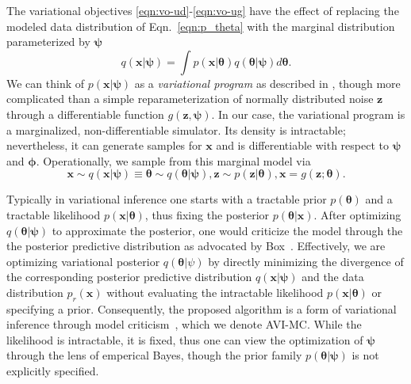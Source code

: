 \documentclass[twocolumn,superscriptaddress,aps]{revtex4-1}
\newcommand{\qxpsi}{q(\mathbf{x}|\bfpsi)}
\newcommand{\bftheta}{{\bm \theta}}
\newcommand{\bfpsi}{{\bm \psi}}
\newcommand{\bfphi}{{\bm \phi}}
\newcommand{\bfx}{\mathbf{x}}
\newcommand{\bfz}{\mathbf{z}}
\theoremstyle{plain}
\begin{document}
The variational objectives \ref{eqn:vo-ud}-\ref{eqn:vo-ug}
have the effect of replacing the modeled data distribution of Eqn.~\ref{eqn:p_theta} with
the marginal distribution parameterized by $\bfpsi$
\begin{equation}
    \qxpsi = \int  p(\mathbf{x}|\bftheta) q(\bftheta|\bfpsi) d\bftheta.
\end{equation}
We can think of $p(\bfx|\bfpsi)$ as a \textit{variational program} as described in \citep{2016arXiv161009033R}, though more complicated than a simple reparameterization of normally distributed noise $\bfz$ through a differentiable function $g(\bfz, \bfpsi)$. In our case, the variational program is a marginalized, non-differentiable  simulator.  Its density is  intractable; nevertheless, it can generate samples for $\bfx$ and is differentiable with respect to $\bfpsi$ and $\bfphi$. 
Operationally, we sample from this marginal model via
\begin{equation}\label{eqn:p_psi}
    \mathbf{x} \sim \qxpsi \equiv \bftheta \sim q(\bftheta|\bfpsi), \bfz \sim p(\bfz|\bftheta), \mathbf{x} = g(\bfz; \bftheta).
\end{equation}

Typically in variational inference one starts with a tractable prior $p(\bftheta)$ and a tractable likelihood $p(\bfx |\bftheta )$, thus fixing the posterior $p(\bftheta | \bfx )$.   After optimizing $q(\bftheta | \bfpsi)$ to approximate the posterior, one would criticize the model through the the posterior predictive distribution as advocated by Box~\citep{box1980sampling}.   
Effectively, we are optimizing variational posterior $q(\bftheta | \psi)$ by directly minimizing the 
divergence of the corresponding posterior predictive distribution $\qxpsi$ and the data distribution $p_r(\bfx)$ without evaluating the intractable likelihood $p(\bfx | \bftheta )$ or specifying a prior. Consequently, the proposed algorithm is a form of variational inference through model criticism~\citep{box1980sampling}, which we denote AVI-MC. While the likelihood is intractable, it is fixed, thus one can view the optimization of $\bfpsi$ through the lens of emperical Bayes, though the prior family $p(\bftheta | \bfpsi)$ is not explicitly specified. 
\end{document}
